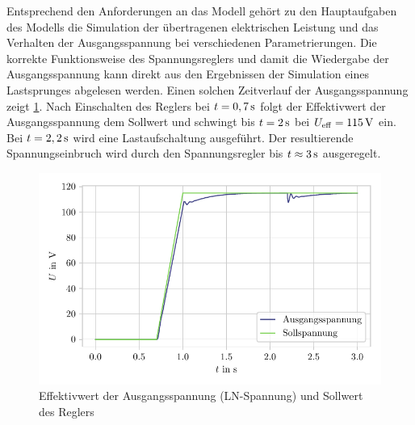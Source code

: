 Entsprechend den Anforderungen an das Modell gehört zu den Hauptaufgaben des Modells die Simulation der übertragenen elektrischen Leistung und das Verhalten der Ausgangsspannung bei verschiedenen Parametrierungen. Die korrekte Funktionsweise des Spannungsreglers und damit die Wiedergabe der Ausgangsspannung kann direkt aus den Ergebnissen der Simulation eines Lastsprunges abgelesen werden. Einen solchen Zeitverlauf der Ausgangsspannung zeigt \cref{fig:Verifikation_Spannung}. Nach Einschalten des Reglers bei $t=\unit[0,7]{s}$ folgt der Effektivwert der Ausgangsspannung dem Sollwert und schwingt bis $t=\unit[2]{s}$ bei $U_{\mathrm{eff}}=\unit[115]{V}$ ein. Bei $t=\unit[2,2]{s}$ wird eine Lastaufschaltung ausgeführt. Der resultierende Spannungseinbruch wird durch den Spannungsregler bis $t\approx\unit[3]{s}$ ausgeregelt.
\begin{figure}
    \centering
    \includegraphics{Bilder/Verifikation_Spannung.pdf}
    \caption{Effektivwert der Ausgangsspannung (LN-Spannung) und Sollwert des Reglers}
    \label{fig:Verifikation_Spannung}
\end{figure}

